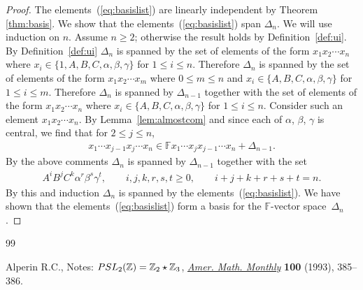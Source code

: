 \documentclass[10pt,a4paper]{amsart}
\begin{document}
\begin{proof}
The elements~(\ref{eq:basislist}) are linearly independent by
Theorem
\ref{thm:basis}. We show that the
elements~(\ref{eq:basislist}) span $\Delta_n$.
We will use induction on $n$. Assume $n\geq 2$; otherwise
the result holds by Def\/inition~\ref{def:ui}.
By Def\/inition~\ref{def:ui} $\Delta_n$ is
spanned by the set of elements of the form
$x_1x_2\cdots x_n$
where $x_i \in \lbrace 1, A,B,C,\alpha,\beta,\gamma\rbrace$
for $1 \leq i \leq n$.
Therefore $\Delta_n$ is spanned by the set of elements
of the form
$x_1x_2\cdots x_m$ where $0 \leq m\leq n$ and
$x_i \in \lbrace A,B,C,\alpha,\beta,\gamma\rbrace$
for $1 \leq i \leq m$.
Therefore $\Delta_n$ is spanned by $\Delta_{n-1}$ together with
the set of elements
of the form
$x_1x_2\cdots x_n$ where
$x_i \in \lbrace A,B,C,\alpha,\beta,\gamma\rbrace$
for $1 \leq i \leq n$.
Consider such an element
$x_1x_2\cdots x_n$.
By Lemma~\ref{lem:almostcom} and since
each of $\alpha$, $\beta$, $\gamma$ is central,
we f\/ind that
for $2 \leq j \leq n$,
\begin{gather*}
x_1\cdots  x_{j-1}x_j\cdots  x_n \in
\mathbb F x_1\cdots x_{j}x_{j-1}\cdots  x_n + \Delta_{n-1}.
\end{gather*}
By the above comments
$\Delta_n$ is spanned by $\Delta_{n-1}$ together with the
set
\begin{gather*}
A^iB^jC^k\alpha^r \beta^s \gamma^t, \qquad
i,j,k,r,s,t\geq 0, \qquad
i+j+k+r+s+t = n.
\end{gather*}
By this and induction
$\Delta_n$ is spanned by the elements~(\ref{eq:basislist}).
We have shown that
the elements~(\ref{eq:basislist}) form a basis  for the $\mathbb F$-vector space~$\Delta_n$.
\end{proof}

\begin{thebibliography}{99}

\footnotesize\itemsep=0pt
Alperin R.C.,
Notes: ${\rm  {PSL}}_2(\mathbb Z)= \mathbb Z_2 \star \mathbb Z_3$,
\href{http://dx.doi.org/10.2307/2324963}{{\it Amer. Math. Monthly}} {\bf 100} (1993), 385--386.
\end{thebibliography}
\end{document}
